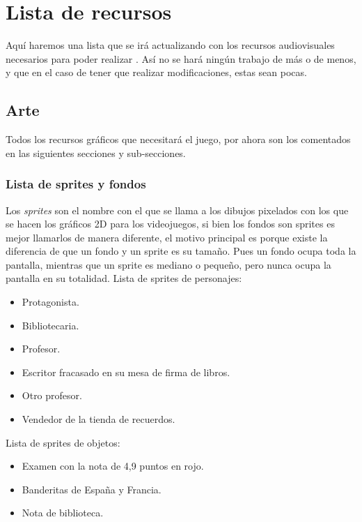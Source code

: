     \section{Lista de recursos}
    Aquí haremos una lista que se irá actualizando con los recursos audiovisuales necesarios para poder realizar \nombrejuego. Así no se hará ningún trabajo de más o de menos, y que en el caso de tener que realizar modificaciones, estas sean pocas.
    
        \subsection{Arte}
        Todos los recursos gráficos que necesitará el juego, por ahora son los comentados en las siguientes secciones y sub-secciones.
            \subsubsection{Lista de sprites y fondos}
            Los \emph{sprites} son el nombre con el que se llama a los dibujos pixelados con los que se hacen los gráficos 2D para los videojuegos, si bien los fondos son sprites es mejor llamarlos de manera diferente, el motivo principal es porque existe la diferencia de que un fondo y un sprite es su tamaño. Pues un fondo ocupa toda la pantalla, mientras que un sprite es mediano o pequeño, pero nunca ocupa la pantalla en su totalidad.
            Lista de sprites de personajes:
            \begin{itemize}
            \item Protagonista.
            \item Bibliotecaria.
            \item Profesor.
            \item Escritor fracasado en su mesa de firma de libros.
            \item Otro profesor.
            \item Vendedor de la tienda de recuerdos.
            \end{itemize}
            
            Lista de sprites de objetos:
            \begin{itemize}
            \item Examen con la nota de 4,9 puntos en rojo.
            \item Banderitas de España y Francia.
            \item Nota de biblioteca.
            \end{itemize}
            
